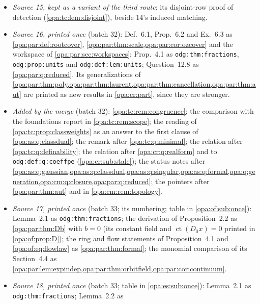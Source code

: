 \documentclass[11pt,oneside]{article}
\numberwithin{equation}{section}
\theoremstyle{definition}
\theoremstyle{remark}
\newcommand{\ct}{\operatorname{ct}}
\newcommand{\lbl}[1]{\nolinkurl{#1}}
\begin{document}
\begin{itemize}[itemsep=2pt]
\cref{opa:as:prop:setpairs,opa:as:cor:setpairs}; Lem.~7.1 as \lbl{odg:thm:fractions}; Thm.~1.2, Cors.~7.2 and 7.4 as
\cref{opa:as:thm:main}; Cor.~7.3 as \cref{opa:as:cor:monodet}; Thm.~8.1 as \cref{opa:as:thm:factor}; Prop.~8.2 as
\cref{opa:thm:criterion}; Rem.~8.3 as \cref{opa:as:rem:admissible}; Cor.~8.4 as \cref{opa:as:cor:arch}; Ex.~8.5 as
\cref{opa:cm:rem:shear}; Thms.~9.2--9.3 as \cref{opa:as:thm:gaussian,opa:as:thm:conjugation}; Thm.~10.2, Cor.~10.3
and Prop.~10.4 as \cref{opa:as:prop:scalarrep,opa:as:thm:adjoint,opa:as:thm:classdefect}.
\item \emph{Source 15, kept as a variant of the third route}: its disjoint-row proof of detection
(\cref{opa:tc:lem:disjoint}), beside 14's induced matching.
\item \emph{Source 16, printed once} (batch 32): Def.~6.1, Prop.~6.2 and Ex.~6.3 as \cref{opa:par:def:rootcover},
\cref{opa:par:thm:scale,opa:par:cor:ozcover} and the workspace of \cref{opa:par:sec:workspaces}; Prop.~4.1 as
\lbl{odg:thm:fractions}, \lbl{odg:prop:units} and \lbl{odg:def:lem:units}; Question~12.8 as \cref{opa:par:q:reduced}.
Its generalizations of \cref{opa:par:thm:poly,opa:par:thm:laurent,opa:par:thm:cancellation,opa:par:thm:aut} are
printed as new results in \cref{opa:cr:part}, since they are stronger.
\item \emph{Added by the merge} (batch 32): \cref{opa:tc:rem:congruence}; the comparison with the foundations report
in \cref{opa:tc:rem:scope}; the reading of \cref{opa:tc:prop:classweights} as an answer to the first clause of
\cref{opa:as:q:classdual}; the remark after \cref{opa:tc:q:minimal}; the relation after \cref{opa:tc:q:definability};
the relation after \cref{opa:cr:q:realform} and to \lbl{odg:def:q:coeffpe} (\cref{opa:cr:sub:stale}); the status notes
after \cref{opa:as:q:gaussian,opa:as:q:classdual,opa:as:q:singular,opa:as:q:formal,opa:q:generation,opa:cm:q:closure,opa:par:q:reduced};
the pointers after \cref{opa:par:thm:aut} and in \cref{opa:cm:rem:topology}.
\item \emph{Source 17, printed once} (batch 33; its numbering; table in \cref{opa:of:sub:once}): Lemma~2.1 as
\lbl{odg:thm:fractions}; the derivation of Proposition~2.2 as \cref{opa:par:thm:Db} with $b=0$ (its constant field and $\ct(D_0x)=0$
printed in \cref{opa:of:prop:D}); the ring and flow statements of Proposition~4.1 and \eqref{opa:of:eq:flowlaw} as
\cref{opa:par:thm:formal}; the monomial comparison of its Section~4.4 as
\cref{opa:par:lem:expindep,opa:par:thm:orbitfield,opa:par:cor:continuum}.
\item \emph{Source 18, printed once} (batch 33; table in \cref{opa:es:sub:once}): Lemma~2.1 as \lbl{odg:thm:fractions}; Lemma~2.2 as

\end{itemize}
\end{document}
